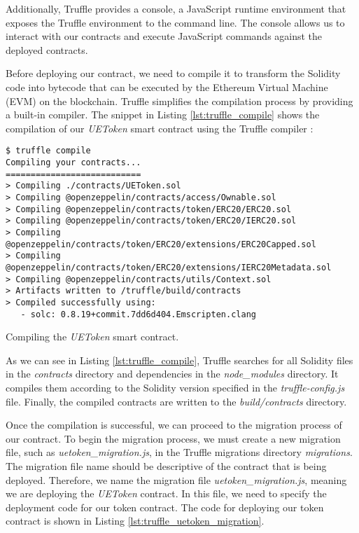 Additionally, Truffle provides a console, a JavaScript runtime environment that exposes the Truffle environment to the command line. The console allows us to interact with our contracts and execute JavaScript commands against the deployed contracts.

Before deploying our contract, we need to compile it to transform the Solidity code into bytecode that can be executed by the Ethereum Virtual Machine (EVM) 
on the blockchain. Truffle simplifies the compilation process by providing a built-in compiler. The snippet in Listing \ref{lst:truffle_compile} shows the compilation
of our \textit{UEToken} smart contract using the Truffle compiler :


\begin{listing}[H]
    \begin{verbatim}
$ truffle compile
Compiling your contracts...
===========================
> Compiling ./contracts/UEToken.sol
> Compiling @openzeppelin/contracts/access/Ownable.sol
> Compiling @openzeppelin/contracts/token/ERC20/ERC20.sol
> Compiling @openzeppelin/contracts/token/ERC20/IERC20.sol
> Compiling @openzeppelin/contracts/token/ERC20/extensions/ERC20Capped.sol
> Compiling @openzeppelin/contracts/token/ERC20/extensions/IERC20Metadata.sol
> Compiling @openzeppelin/contracts/utils/Context.sol
> Artifacts written to /truffle/build/contracts
> Compiled successfully using:
   - solc: 0.8.19+commit.7dd6d404.Emscripten.clang
    \end{verbatim}
    \caption{Compiling the \textit{UEToken} smart contract.}
    \label{lst:truffle_compile}
\end{listing}

As we can see in Listing \ref{lst:truffle_compile}, Truffle searches for all Solidity files in the \textit{contracts} directory and dependencies in the \textit{node\_modules} directory.
It compiles them according to the Solidity version specified in the \textit{truffle-config.js} file. Finally, the compiled contracts are written to the \textit{build/contracts} directory.


Once the compilation is successful, we can proceed to the migration process of our contract. To begin the migration process, we must create a new migration
file, such as \textit{uetoken\_migration.js}, in the Truffle migrations directory \textit{migrations}. The migration file name should be descriptive of the contract
that is being deployed. Therefore, we name the migration file \textit{uetoken\_migration.js}, meaning we are deploying the \textit{UEToken} contract. In this file,
we need to specify the deployment code for our token contract. The code for deploying our token contract is shown in Listing \ref{lst:truffle_uetoken_migration}.

